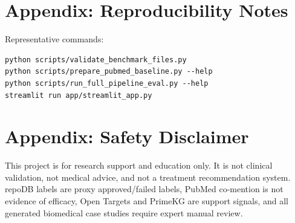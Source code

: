 \documentclass[11pt]{article}
\newcommand{\safetext}{This project is for research support and education only. It is not clinical validation, not medical advice, and not a treatment recommendation system.}
\begin{document}
\appendix
\section{Appendix: Reproducibility Notes}
Representative commands:
\begin{verbatim}
python scripts/validate_benchmark_files.py
python scripts/prepare_pubmed_baseline.py --help
python scripts/run_full_pipeline_eval.py --help
streamlit run app/streamlit_app.py
\end{verbatim}

\section{Appendix: Safety Disclaimer}
\safetext{} repoDB labels are proxy approved/failed labels, PubMed co-mention is not evidence of efficacy, Open Targets and PrimeKG are support signals, and all generated biomedical case studies require expert manual review.



\end{document}
